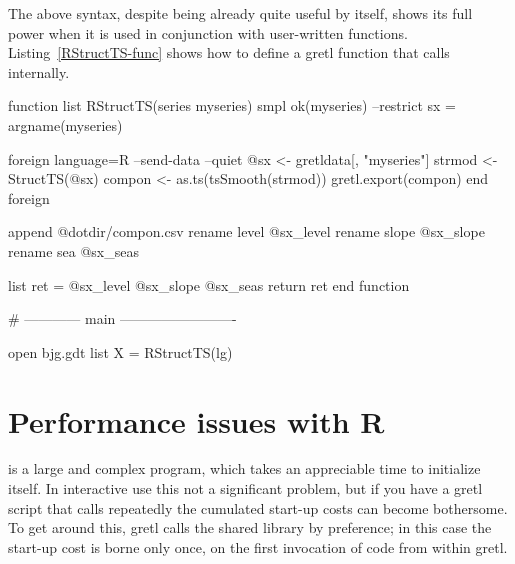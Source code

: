 \begin{script}[htbp]
  \label{RStructTS-simple}
\end{script}

The above syntax, despite being already quite useful by itself, shows
its full power when it is used in conjunction with user-written
functions.  Listing~\ref{RStructTS-func} shows how to define a
gretl function that calls  internally.

\begin{script}[htbp]
  \label{RStructTS-func}
\begin{scode}
function list RStructTS(series myseries)
    smpl ok(myseries) --restrict
    sx = argname(myseries)

    foreign language=R --send-data --quiet
        @sx <- gretldata[, "myseries"]
        strmod <- StructTS(@sx)
        compon <- as.ts(tsSmooth(strmod))
        gretl.export(compon)
    end foreign

    append @dotdir/compon.csv
    rename level @sx_level
    rename slope @sx_slope
    rename sea @sx_seas

    list ret = @sx_level @sx_slope @sx_seas
    return ret
end function

# ------------ main -------------------------

open bjg.gdt
list X = RStructTS(lg)
\end{scode}
\end{script}

\section{Performance issues with R}
\label{sec:R-performance}

 is a large and complex program, which takes an appreciable
time to initialize itself.  In interactive use this not a significant
problem, but if you have a gretl script that calls  repeatedly
the cumulated start-up costs can become bothersome.  To get around
this, gretl calls the  shared library by preference; in this
case the start-up cost is borne only once, on the first invocation of
 code from within gretl.

